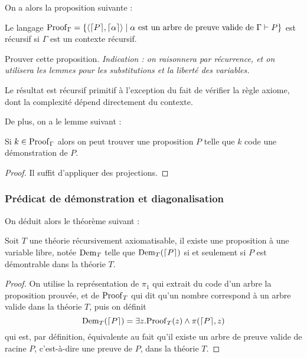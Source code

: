 On a alors la proposition suivante :

\begin{prop}
    Le langage $\mathrm{Proof}_{\Gamma} =\{\langle\lceil P \rceil,\lceil \alpha \rceil\rangle\mid \alpha\text{ est un arbre de preuve valide de } \Gamma\vdash P\}$ est récursif si $\Gamma$ est un contexte récursif.
\end{prop}

\begin{exo}
    Prouver cette proposition. \textit{Indication : on raisonnera par récurrence, et on utilisera les lemmes pour les substitutions et la liberté des variables.}
\end{exo}

\begin{rmk}
    Le résultat est récursif primitif à l'exception du fait de vérifier la règle axiome, dont la complexité dépend directement du contexte.
\end{rmk}

De plus, on a le lemme suivant :

\begin{lem}
    Si $k\in\mathrm{Proof}_\Gamma$ alors on peut trouver une proposition $P$ telle que $k$ code une démonstration de $P$.
\end{lem}

\begin{proof}
    Il suffit d'appliquer des projections.
\end{proof}

\subsubsection{Prédicat de démonstration et diagonalisation}

On déduit alors le théorème suivant :

\begin{them}
    Soit $T$ une théorie récursivement axiomatisable, il existe une proposition à une variable libre, notée $\mathrm{Dem}_T$ telle que $\mathrm{Dem}_T(\lceil P \rceil)$ si et seulement si $P$ est démontrable dans la théorie $T$.
\end{them}

\begin{proof}
    On utilise la représentation de $\pi_1$ qui extrait du code d'un arbre la proposition prouvée, et de $\mathrm{Proof}_T$ qui dit qu'un nombre correspond à un arbre valide dans la théorie $T$, puis on définit $$\mathrm{Dem}_T(\lceil P \rceil) = \exists z. \mathrm{Proof}_T(z) \land \pi(\lceil P \rceil,z)$$ qui est, par définition, équivalente au fait qu'il existe un arbre de preuve valide de racine $P$, c'est-à-dire une preuve de $P$, dans la théorie $T$.
\end{proof}

